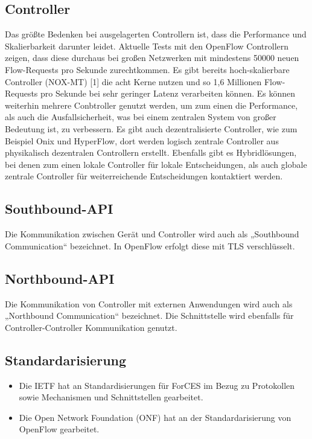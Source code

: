 \documentclass[twoside,12pt]{scrartcl}
\begin{document}
		\subsection{Controller}
Das größte Bedenken bei ausgelagerten Controllern ist, dass die Performance und Skalierbarkeit darunter leidet. Aktuelle Tests mit den OpenFlow Controllern zeigen, dass diese durchaus bei großen Netzwerken mit mindestens 50000 neuen Flow-Requests pro Sekunde zurechtkommen. Es gibt bereits hoch-skalierbare Controller (NOX-MT) [1] die acht Kerne nutzen und so 1,6 Millionen Flow-Requests pro Sekunde bei sehr geringer Latenz verarbeiten können. Es können weiterhin mehrere Conbtroller genutzt werden, um zum einen die Performance, als auch die Ausfallsicherheit, was bei einem zentralen System von großer Bedeutung ist, zu verbessern. Es gibt auch dezentralisierte Controller, wie zum Beispiel Onix und HyperFlow, dort werden logisch zentrale Controller aus physikalisch dezentralen Controllern erstellt. Ebenfalls gibt es Hybridlösungen, bei denen zum einen lokale Controller für lokale Entscheidungen, als auch globale zentrale Controller für weiterreichende Entscheidungen kontaktiert werden.
		\subsection{Southbound-API}
Die Kommunikation zwischen Gerät und Controller wird auch als „Southbound Communication“ bezeichnet. In OpenFlow erfolgt diese mit TLS verschlüsselt.
		\subsection{Northbound-API}
Die Kommunikation von Controller mit externen Anwendungen  wird auch als „Northbound Communication“ bezeichnet. Die Schnittstelle wird ebenfalls für Controller-Controller Kommunikation genutzt.
		\subsection{Standardarisierung}
		\begin{itemize}
			\item Die IETF hat an Standardisierungen für ForCES im Bezug zu Protokollen sowie Mechanismen und Schnittstellen gearbeitet.
			\item Die Open Network Foundation (ONF) hat an der Standardarisierung von OpenFlow gearbeitet.
		\end{itemize}
\end{document}
